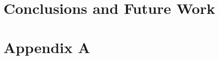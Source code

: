 \documentclass[
     12pt,         %
     a4paper,      %
     BCOR10mm,     %
     DIV14,        %
     ]{scrreprt}
\begin{document}


\newpage

\chapter{Conclusions and Future Work}
\label{chap:concl}




\appendix

\chapter{Appendix A}
\label{app:appendixA}


% 


\end{document}
